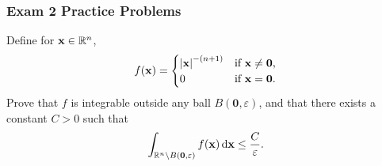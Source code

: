 \subsubsection{Exam 2 Practice Problems}
\setcounter{exercise}{0}
\setcounter{equation}{0}

\begin{problem}
Define for $\mathbf{x}\in\mathbb{R}^n$,
\[
f(\mathbf{x})=
\begin{cases}
\left|\mathbf{x}\right|^{-(n+1)}&\text{if $\mathbf{x}\neq \mathbf{0}$,}\\
0&\text{if $\mathbf{x}=\mathbf{0}$.}
\end{cases}
\]
Prove that $f$ is integrable outside any ball $B(\mathbf{0},\varepsilon)$,
and that there exists a constant $C>0$ such that
\[
\int_{\mathbb{R}^n\setminus B(\mathbf{0},\varepsilon)}f(\mathbf{x}) \mathop{}\!\mathrm{d} \mathbf{x}\leq\frac{C}{\varepsilon}.
\]
\end{problem}
